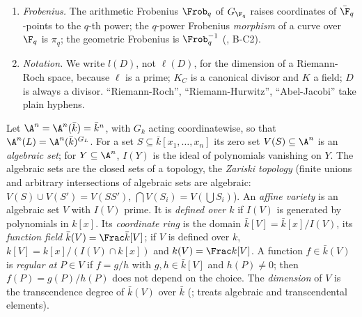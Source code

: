 \begin{convention}
\begin{enumerate}[label=(C\arabic*)]
representatives). The intersection number $a\cdot b$ of transverse oriented loops counts crossings with sign $+1$ when (tangent of $a$,
tangent of $b$) is a positive basis. Poincare duality $\operatorname{PD}\colon H^1\to H_1$ is fixed by $\int_{\operatorname{PD}(\theta)}\eta=\langle\theta,\eta\rangle$.
Other books use other signs; the paper needs only properties that do not change under a global sign (perfectness, alternation,
adjointness, ideals of values, Gram determinants in even rank), , B-C5(d).
\item \emph{Frobenius.} The arithmetic Frobenius $\Frob_q$ of $G_{\F_q}$ raises coordinates of $\bar\F_q$-points to the $q$-th power; the
$q$-power Frobenius \emph{morphism} of a curve over $\F_q$ is $\pi_q$; the geometric Frobenius is $\Frob_q^{-1}$ (, B-C2).
\item \emph{Notation.} We write $l(D)$, not $\ell(D)$, for the dimension of a Riemann-Roch space, because $\ell$ is a prime; $K_C$ is a
canonical divisor and $K$ a field; $D$ is always a divisor. ``Riemann-Roch'', ``Riemann-Hurwitz'', ``Abel-Jacobi'' take plain
hyphens.
\end{enumerate}
\end{convention}

\begin{definition}\label{def:curves:affine-variety}
Let $\A^n=\A^n(\bar k)=\bar k^n$, with $G_k$ acting coordinatewise, so that $\A^n(L)=\A^n(\bar k)^{G_L}$. For a set $S\subseteq\bar k[x_1,\dots,x_n]$ its zero set
$V(S)\subseteq\A^n$ is an \emph{algebraic set}; for $Y\subseteq\A^n$, $I(Y)$ is the ideal of polynomials vanishing on $Y$. The algebraic sets are the closed sets
of a topology, the \emph{Zariski topology} (finite unions and arbitrary intersections of algebraic sets are algebraic: $V(S)\cup V(S')=V(SS')$,
$\bigcap V(S_i)=V(\bigcup S_i)$). An \emph{affine variety} is an algebraic set $V$ with $I(V)$ prime. It is \emph{defined over $k$} if $I(V)$ is generated by
polynomials in $k[x]$. Its \emph{coordinate ring} is the domain $\bar k[V]=\bar k[x]/I(V)$, its \emph{function field} $\bar k(V)=\Frac\bar k[V]$; if $V$ is defined
over $k$, $k[V]=k[x]/(I(V)\cap k[x])$ and $k(V)=\Frac k[V]$. A function $f\in\bar k(V)$ is \emph{regular at} $P\in V$ if $f=g/h$ with $g,h\in\bar k[V]$ and
$h(P)\ne0$; then $f(P)=g(P)/h(P)$ does not depend on the choice. The \emph{dimension} of $V$ is the transcendence degree of $\bar k(V)$ over $\bar k$
(\cite[Chapter VIII, Section 1]{Lang};  treats algebraic and transcendental elements).
\end{definition}

